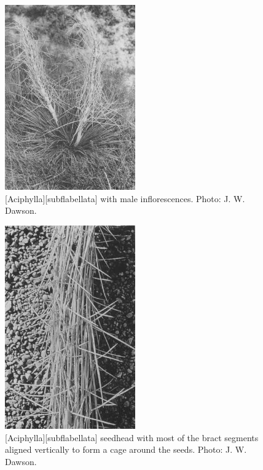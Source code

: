 \begin{figure}
	\includegraphics[width=0.5\textwidth]{graphics/figure84aciphylla.jpg}
	\centering
	\caption[\emph{Aciphylla subflabellata with male inflorescencs}]{[Aciphylla][subflabellata] with male inflorescences.
	Photo:  J. W. Dawson.}%
	\label{fig:84aciphylla}
\end{figure}

\begin{figure}
	\includegraphics[width=0.5\textwidth]{graphics/figure85aciphylla-seedhead.jpg}
	\centering
	\caption[\emph{Aciphylla subflabellata} seedhead]{[Aciphylla][subflabellata] seedhead with most of the bract segments aligned vertically to form a cage around the seeds.
	Photo:  J. W. Dawson.}%
	\label{fig:85aciphylla-seedhead}
\end{figure}

